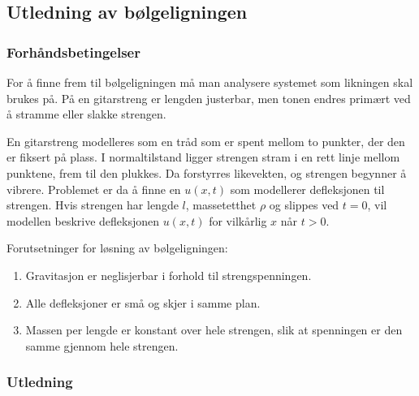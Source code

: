 \subsection{Utledning av bølgeligningen}
\subsubsection{Forhåndsbetingelser}
For å finne frem til bølgeligningen må man analysere systemet som likningen skal brukes på.
På en gitarstreng er lengden justerbar, men tonen endres primært ved å stramme eller slakke
strengen.

En gitarstreng modelleres som en tråd som er spent mellom to punkter, der den er fiksert på plass.
I normaltilstand ligger strengen stram i en rett linje mellom punktene, frem til den plukkes. Da
forstyrres likevekten, og strengen begynner å vibrere. Problemet er da å finne en $u(x,t)$ som modellerer
defleksjonen til strengen. Hvis strengen har lengde $l$, massetetthet $\rho$ og slippes ved $t=0$,
vil modellen beskrive defleksjonen $u(x,t)$ for vilkårlig $x$ når $t>0$.

Forutsetninger for løsning av bølgeligningen:

\begin{enumerate}
  \item Gravitasjon er neglisjerbar i forhold til strengspenningen.
  \item Alle defleksjoner er små og skjer i samme plan.
  \item Massen per lengde er konstant over hele strengen, slik at spenningen er den samme
  gjennom hele strengen.
\end{enumerate}
\clearpage
\subsubsection{Utledning}


